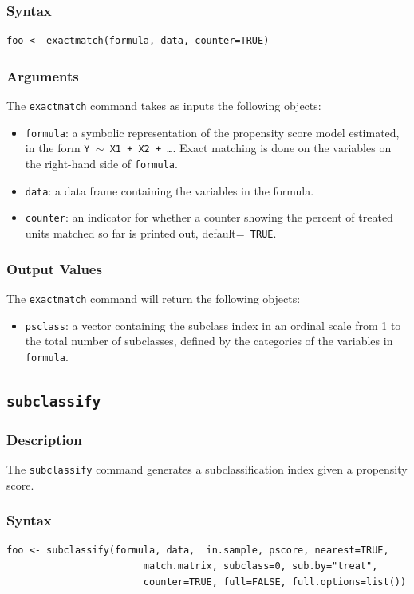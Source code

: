 \documentclass[oneside,letterpaper,titlepage]{article}
\begin{document}
\begin{appendix}
\subsubsection{Syntax}
\begin{verbatim}
foo <- exactmatch(formula, data, counter=TRUE)
\end{verbatim} 

\subsubsection{Arguments}
The \texttt{exactmatch} command takes as inputs the following
objects:
\begin{itemize}
\item \texttt{formula}: a symbolic representation of the propensity
  score model estimated, in the form {\tt Y $\sim$ X1 + X2 + \dots}.
  Exact matching is done on the variables on the right-hand side of
  \texttt{formula}.
\item \texttt{data}: a data frame containing the variables in the
  formula.
\item \texttt{counter}: an indicator for whether a counter showing the
  percent of treated units matched so far is printed out, default={\tt
    TRUE}.
\end{itemize}

\subsubsection{Output Values}
The \texttt{exactmatch} command will return the following objects:
\begin{itemize}
\item \texttt{psclass}: a vector containing the subclass index in an ordinal
  scale from 1 to the total number of subclasses, defined by the
  categories of the variables in {\tt formula}.
\end{itemize}

\subsection{\texttt{subclassify}}

\subsubsection{Description}
The \texttt{subclassify} command generates a subclassification index
given a propensity score. 

\subsubsection{Syntax}
\begin{verbatim}
foo <- subclassify(formula, data,  in.sample, pscore, nearest=TRUE, 
                        match.matrix, subclass=0, sub.by="treat", 
                        counter=TRUE, full=FALSE, full.options=list())
\end{verbatim} 


\end{appendix}
\end{document}
